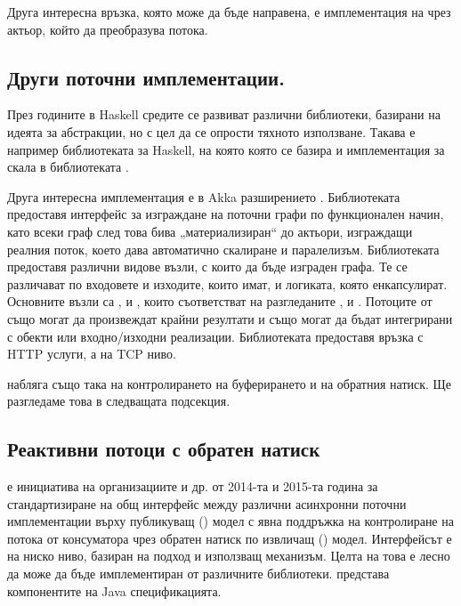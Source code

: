 Друга интересна връзка, която може да бъде направена, е имплементация на  чрез актьор, който да преобразува потока.

\subsection{Други поточни имплементации. }

През годините в Haskell средите се развиват различни библиотеки, базирани на идеята за  абстракции, но с цел да се опрости тяхното използване. Такава е например библиотеката  за Haskell, на която която се базира и имплементация за скала в библиотеката .

Друга интересна имплементация е в Akka разширението  \cite{akkaStreams2015}. Библиотеката предоставя интерфейс за изграждане на поточни графи по функционален начин, като всеки граф след това бива „материализиран“ до актьори, изграждащи реалния поток, което дава автоматично скалиране и паралелизъм. Библиотеката предоставя различни видове възли, с които да бъде изграден графа. Те се различават по входовете и изходите, които имат, и логиката, която енкапсулират. Основните възли са ,  и , които съответстват на разгледаните ,  и . Потоците от  също могат да произвеждат крайни резултати и също могат да бъдат интегрирани с  обекти или входно/изходни реализации. Библиотеката  предоставя връзка с HTTP услуги, а  на TCP ниво.

 набляга също така на контролирането на буферирането и на обратния натиск. Ще разгледаме това в следващата подсекция.

\subsection{Реактивни потоци с обратен натиск}
\label{sec:reactive-streams-with-backpressure}

 \cite{reactiveStreamsSpecification2015} е инициатива на организациите  и др. от 2014-та и 2015-та година за стандартизиране на общ интерфейс между различни асинхронни поточни имплементации върху публикуващ () модел с явна поддръжка на контролиране на потока от консуматора чрез обратен натиск по извличащ () модел. Интерфейсът е на ниско ниво, базиран на  подход и използващ  механизъм. Целта на това е лесно да може да бъде имплементиран от различните библиотеки.  представа компонентите на Java спецификацията.

